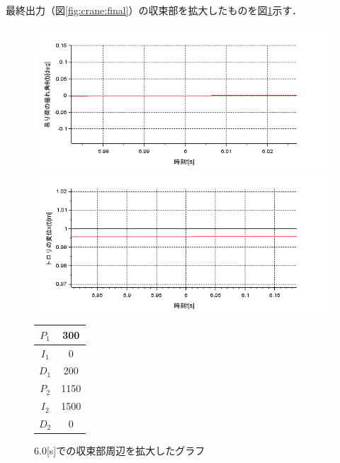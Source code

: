 \documentclass[dvipdfmx,titlepage,a4j]{jsarticle}  %
\begin{document}
最終出力（図\ref{fig:crane:final}）の収束部を拡大したものを図\ref{fig:crane:max}示す．

\begin{figure}[H]
  \begin{minipage}{4.5cm}
    \centering
    \includegraphics[keepaspectratio, scale=0.35]{../graph/crane/ang-max.png}
  \end{minipage}
  \hfill
  \begin{minipage}{4.5cm}
    \centering
    \includegraphics[keepaspectratio, scale=0.35]{../graph/crane/po-max.png}
  \end{minipage}
  \hfill
  \begin{minipage}{3cm}
      \begin{center}
        \begin{tabular}{c|c}
          \hline
          $P_1$ & 300\\ \hline
          $I_1$ & 0\\ \hline
          $D_1$ & 200\\ \hline
          $P_2$ & 1150\\ \hline
          $I_2$ & 1500\\ \hline
          $D_2$ & 0\\
          \hline
        \end{tabular}
      \end{center}
  \end{minipage}
  \hfill
  \caption{6.0[s]での収束部周辺を拡大したグラフ}
  \label{fig:crane:max}
\end{figure}
\end{document}
